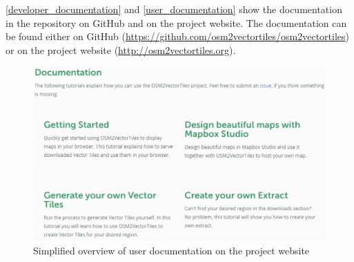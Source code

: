 \autoref{developer_documentation} and \autoref{user_documentation} show the documentation in the repository on GitHub and on the project website. The documentation can be found either on GitHub (\url{https://github.com/osm2vectortiles/osm2vectortiles}) or on the project website (\url{http://osm2vectortiles.org}).

\begin{figure}[H]
  \centering
  \includegraphics[width=1.0\textwidth]{images/documentation/user_documentation}
  \caption{Simplified overview of user documentation on the project website}
  \label{user_documentation}
\end{figure}